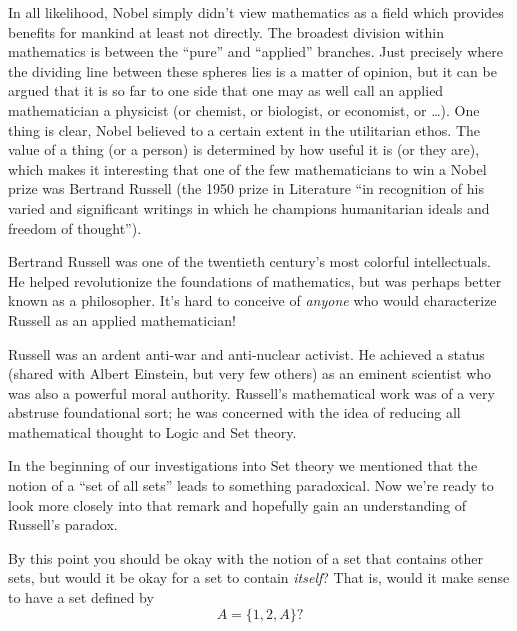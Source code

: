 \documentclass[10pt,]{book}
\theoremstyle{plain}
\theoremstyle{definition}
\theoremstyle{definition}
\numberwithin{equation}{section}
\begin{document}
    In all likelihood, Nobel simply didn't view mathematics as a field
    which provides benefits for mankind \textemdash{} at least not directly.
    The broadest division within mathematics is between the ``pure''
    and ``applied'' branches. Just precisely where the dividing line
    between these spheres lies is a matter of opinion, but it can be
    argued that it is so far to one side that one may as well call an
    applied mathematician a physicist
    (or chemist, or biologist, or economist, or \dots{}). One thing is
    clear, Nobel believed to a certain extent in the utilitarian ethos.
    The value of a thing (or a person) is determined by how useful it is (or they
    are), which makes it interesting that one of the few mathematicians
    to win a Nobel prize was Bertrand Russell (the 1950 prize in Literature
    ``in recognition of his varied and significant writings in which he
    champions humanitarian ideals and freedom of thought'').
\par

    Bertrand Russell was one of the twentieth century's most colorful
    intellectuals. He helped revolutionize the foundations of mathematics,
    but was perhaps better known as a philosopher. It's hard to conceive
    of \emph{anyone} who would characterize Russell as an applied mathematician!
\par

    Russell was an ardent anti-war and anti-nuclear activist. He achieved a
    status (shared with Albert Einstein, but very few others) as an eminent
    scientist who was also a powerful moral authority. Russell's mathematical
    work was of a very abstruse foundational sort; he was concerned with
    the idea of reducing all mathematical thought to Logic and Set theory.
\par

    In the beginning of our investigations into Set theory we mentioned
    that the notion of a ``set of all sets'' leads to something paradoxical.
    Now we're ready to look more closely into that remark and hopefully
    gain an understanding of Russell's paradox.
\par

    By this point you should be okay with the notion of a set that
    contains other sets, but would it be okay for a set to contain
    \emph{itself}? That is, would it make sense to have a set
    defined by
    \begin{equation*}
      A = \{ 1, 2, A \}?
    \end{equation*}
\par
\end{document}
